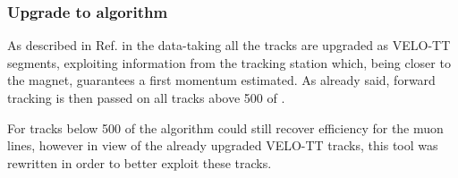 \subsubsection{Upgrade to \mvTTm algorithm}
\label{sec:matchvelottmuon}

As described in Ref.\cite{LHCb-PUB-2015-005} in the \runtwo data-taking all the tracks are upgraded as VELO-TT segments,
exploiting information from the \ttracker tracking station which, being closer to the magnet,
guarantees a first momentum estimated. As already said, forward tracking is then passed on
all tracks above 500 \mevc of \pt.

For tracks below 500 \mevc of \pt the \mvm algorithm could still recover efficiency for the muon lines,
however in view of the already upgraded VELO-TT tracks, this tool was rewritten in order to better exploit these tracks.

